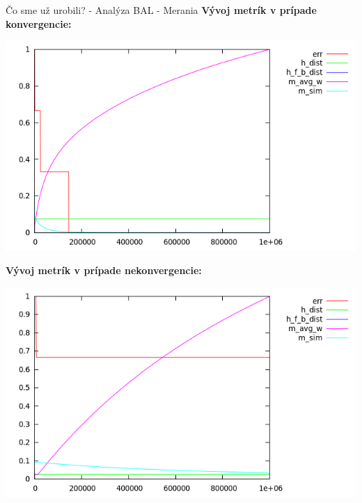\documentclass[xcolor=dvipsnames]{beamer}
\begin{document}
\begin{frame}{Čo sme už urobili? - Analýza BAL - Merania}
  \textbf{Vývoj metrík v prípade konvergencie:}
    \begin{center}
      \includegraphics[scale=0.5]{img/bal_measure_0_norm.png}
    \end{center} 
  \textbf{Vývoj metrík v prípade nekonvergencie:}
    \begin{center}
      \includegraphics[scale=0.5]{img/bal_measure_4_norm.png}
    \end{center} 
\end{frame}
\end{document}
